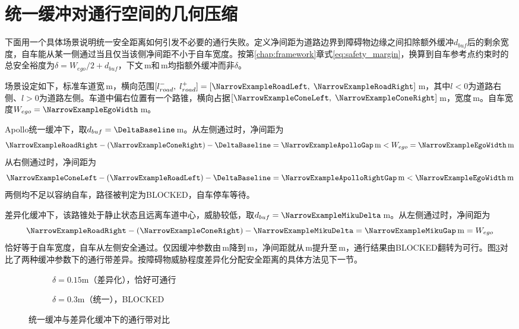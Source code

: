 \section{统一缓冲对通行空间的几何压缩}

下面用一个具体场景说明统一安全距离如何引发不必要的通行失败。定义净间距为道路边界到障碍物边缘之间扣除额外缓冲$d_{buf}$后的剩余宽度，自车能从某一侧通过当且仅当该侧净间距不小于自车宽度。按第\ref{chap:framework}章式\eqref{eq:safety_margin}，换算到自车参考点约束时的总安全裕度为$\delta = W_{ego}/2 + d_{buf}$，下文\DeltaBaseline\,m和\NarrowExampleMikuDelta\,m均指额外缓冲而非$\delta$。

场景设定如下，标准车道宽\NarrowRoadWidth\,m，横向范围$[l_{road}^-,\;l_{road}^+] = [\NarrowExampleRoadLeft,\;\NarrowExampleRoadRight]$\,m，其中$l<0$为道路右侧、$l>0$为道路左侧。车道中偏右位置有一个路锥，横向占据$[\NarrowExampleConeLeft,\; \NarrowExampleConeRight]$\,m，宽度\NarrowExampleConeWidth\,m。自车宽度$W_{ego} = \NarrowExampleEgoWidth$\,m。

Apollo统一缓冲下，取$d_{buf} = \DeltaBaseline$\,m。从左侧通过时，净间距为
\[
\NarrowExampleRoadRight - (\NarrowExampleConeRight) - \DeltaBaseline = \NarrowExampleApolloGap\,\text{m} < W_{ego} = \NarrowExampleEgoWidth\,\text{m}
\]
从右侧通过时，净间距为
\[
\NarrowExampleConeLeft - (\NarrowExampleRoadLeft) - \DeltaBaseline = \NarrowExampleApolloRightGap\,\text{m} < \NarrowExampleEgoWidth\,\text{m}
\]
两侧均不足以容纳自车，路径被判定为BLOCKED，自车停车等待。

差异化缓冲下，该路锥处于静止状态且远离车道中心，威胁较低，取$d_{buf} = \NarrowExampleMikuDelta$\,m。从左侧通过时，净间距为
\[
\NarrowExampleRoadRight - (\NarrowExampleConeRight) - \NarrowExampleMikuDelta = \NarrowExampleMikuGap\,\text{m} = W_{ego}
\]
恰好等于自车宽度，自车从左侧安全通过。仅因缓冲参数由\DeltaBaseline\,m降到\NarrowExampleMikuDelta\,m，净间距就从\NarrowExampleApolloGap\,m提升至\NarrowExampleMikuGap\,m，通行结果由BLOCKED翻转为可行。图\ref{fig:safety_margin_compression}对比了两种缓冲参数下的通行带差异。按障碍物威胁程度差异化分配安全距离的具体方法见下一节。

\begin{figure}[htbp]
\centering
\begin{subfigure}[b]{0.48\textwidth}
  \centering
  \caption{$\delta{=}0.15$m（差异化），恰好可通行}
  \label{fig:safety_margin_compression:a}
\end{subfigure}\hfill
\begin{subfigure}[b]{0.48\textwidth}
  \centering
  \caption{$\delta{=}0.3$m（统一），BLOCKED}
  \label{fig:safety_margin_compression:b}
\end{subfigure}
\caption{统一缓冲与差异化缓冲下的通行带对比}
\label{fig:safety_margin_compression}
\end{figure}
